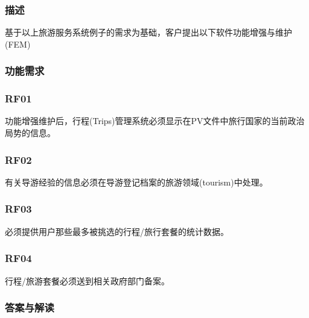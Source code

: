 \hypertarget{ux63a5ux4e58ux5ba2}{%
\subsubsection{描述}\label{ux63a5ux4e58ux5ba2}}

基于以上旅游服务系统例子的需求为基础，客户提出以下软件功能增强与维护(FEM)\\

\hypertarget{ux63a5ux4e58ux5ba2}{%
\subsubsection{功能需求}\label{ux63a5ux4e58ux5ba2}}

\hypertarget{ux63a5ux4e58ux5ba2}{%
\subsubsection{RF01}\label{ux63a5ux4e58ux5ba2}}

功能增强维护后，行程(Trips)管理系统必须显示在PV文件中旅行国家的当前政治局势的信息。\\

\hypertarget{ux63a5ux4e58ux5ba2}{%
\subsubsection{RF02}\label{ux63a5ux4e58ux5ba2}}

有关导游经验的信息必须在导游登记档案的旅游领域(tourism)中处理。


\hypertarget{ux63a5ux4e58ux5ba2}{%
\subsubsection{RF03}\label{ux63a5ux4e58ux5ba2}}


必须提供用户那些最多被挑选的行程/旅行套餐的统计数据。

\hypertarget{ux63a5ux4e58ux5ba2}{%
\subsubsection{RF04}\label{ux63a5ux4e58ux5ba2}}

行程/旅游套餐必须送到相关政府部门备案。\\

\hypertarget{ux63a5ux4e58ux5ba2}{%
\subsubsection{答案与解读}\label{ux63a5ux4e58ux5ba2}}

